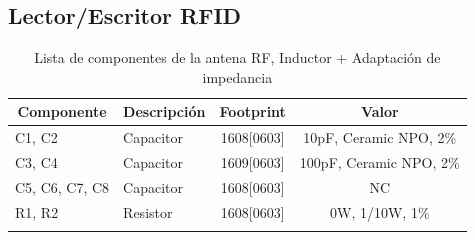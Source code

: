 \newpage
\subsection{Lector/Escritor RFID}
\begin{longtable}{|l|l|c|c|}
\hline
\multicolumn{1}{|c|}{\textbf{Componente}} & \multicolumn{1}{c|}{\textbf{Descripción}} & \textbf{ Footprint} & \textbf{Valor} \\ \hline
C1, C2 & Capacitor & 1608[0603] & 10pF,   Ceramic NPO, 2\% \\ \hline
C3, C4 & Capacitor & 1609[0603] & 100pF, Ceramic NPO, 2\% \\ \hline
C5, C6, C7, C8 & Capacitor & 1608[0603] &  NC \\ \hline
R1,  R2 & Resistor & 1608[0603] & 0W,  1/10W,  1\% \\ \hline
\caption{Lista de componentes de la antena RF, Inductor + Adaptación de impedancia}
\label{}
\end{longtable}

